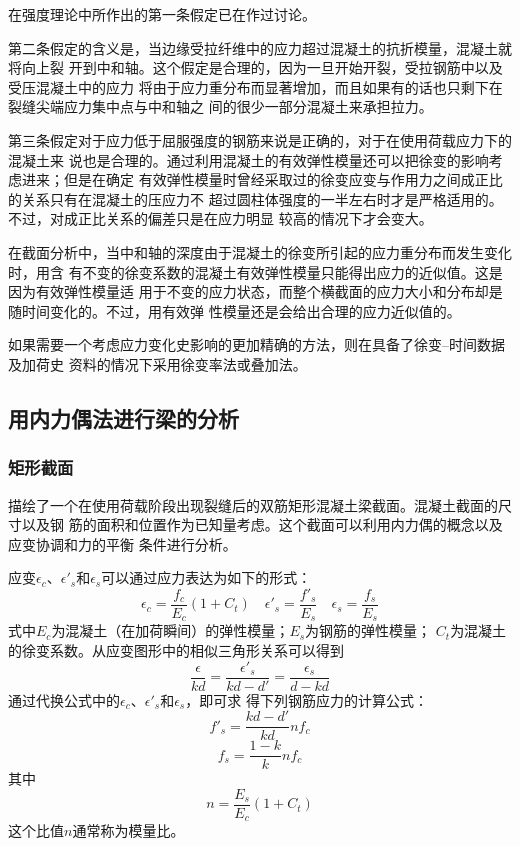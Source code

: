 \documentclass[12pt,a4paper]{book}
\begin{document}
在强度理论中所作出的第一条假定已在作过讨论。

第二条假定的含义是，当边缘受拉纤维中的应力超过混凝土的抗折模量，混凝土就将向上裂
开到中和轴。这个假定是合理的，因为一旦开始开裂，受拉钢筋中以及受压混凝土中的应力
将由于应力重分布而显著增加，而且如果有的话也只剩下在裂缝尖端应力集中点与中和轴之
间的很少一部分混凝土来承担拉力。

第三条假定对于应力低于屈服强度的钢筋来说是正确的，对于在使用荷载应力下的混凝土来
说也是合理的。通过利用混凝土的有效弹性模量还可以把徐变的影响考虑进来；但是在确定
有效弹性模量时曾经采取过的徐变应变与作用力之间成正比的关系只有在混凝土的压应力不
超过圆柱体强度的一半左右时才是严格适用的。不过，对成正比关系的偏差只是在应力明显
较高的情况下才会变大。

在截面分析中，当中和轴的深度由于混凝土的徐变所引起的应力重分布而发生变化时，用含
有不变的徐变系数的混凝土有效弹性模量只能得出应力的近似值。这是因为有效弹性模量适
用于不变的应力状态，而整个横截面的应力大小和分布却是随时间变化的。不过，用有效弹
性模量还是会给出合理的应力近似值的。

如果需要一个考虑应力变化史影响的更加精确的方法，则在具备了徐变--时间数据及加荷史
资料的情况下采用徐变率法或叠加法。

\subsection{用内力偶法进行梁的分析}

\subsubsection{矩形截面}

描绘了一个在使用荷载阶段出现裂缝后的双筋矩形混凝土梁截面。混凝土截面的尺寸以及钢
筋的面积和位置作为已知量考虑。这个截面可以利用内力偶的概念以及应变协调和力的平衡
条件进行分析。

应变$\epsilon_c$、$\epsilon'_s$和$\epsilon_s$可以通过应力表达为如下的形式：
\begin{equation*}
\epsilon_c=\frac{f_c}{E_c}(1+C_t)\quad\epsilon'_s=\frac{f'_s}{E_s}\quad\epsilon_s=\frac{f_s}{E_s}
\end{equation*}式中$E_c$为混凝土（在加荷瞬间）的弹性模量；$E_s$为钢筋的弹性模量；
$C_t$为混凝土的徐变系数。从应变图形中的相似三角形关系可以得到
\begin{equation*}
\frac{\epsilon}{kd}=\frac{\epsilon'_s}{kd-d'}=\frac{\epsilon_s}{d-kd}
\end{equation*}通过代换公式中的$\epsilon_c$、$\epsilon'_s$和$\epsilon_s$，即可求
得下列钢筋应力的计算公式：
\begin{equation}
  \label{eq:27} f'_s=\frac{kd-d'}{kd}nf_c
\end{equation}
\begin{equation}
  \label{eq:24} f_s=\frac{1-k}{k}nf_c
\end{equation}其中
\begin{equation}
  \label{eq:28} n=\frac{E_s}{E_c}(1+C_t)
\end{equation}这个比值$n$通常称为模量比。
\end{document}
